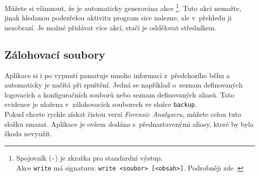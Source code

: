 \documentclass[a4paper,12pt]{article}
\begin{document}
Můžete si všimnout, že je automaticky generována akce \footnote{Spojovník (\texttt{-}) je zkratka pro standardní výstup. \\Akce \texttt{write} má signaturu: \texttt{write <soubor> [<obsah>]}. Podrobněji zde \cite{secManPage}.}. Tuto akci nemažte, jinak hledanou podezřelou aktivitu program sice nalezne, ale v~přehledu ji nezobrazí. Je možné přidávat více akcí, stačí je oddělovat středníkem.

\subsection{Zálohovací soubory}
Aplikace si i po vypnutí pamatuje mnoho informací z~předchozího běhu a automaticky je načítá při spuštění. Jedná se například o~seznam definovaných logovacích a konfiguračních souborů nebo seznam definovaných aliasů. Tato evidence je uložena v~zálohovacích souborech ve složce \texttt{backup}. \\Pokud chcete rychle získat čistou verzi \textit{Forensic Analyzeru}, můžete celou tuto složku smazat. Aplikace je ovšem dodána s~přednastavenými aliasy, které by byla  škoda nevyužít.
\end{document}
